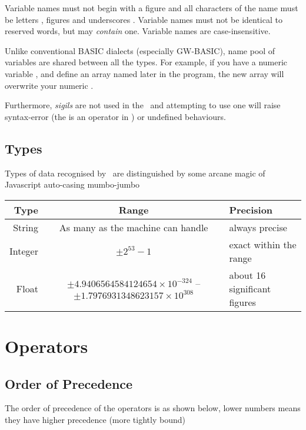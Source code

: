 Variable names must not begin with a figure and all characters of the name must be letters , figures  and underscores \code{\_}. Variable names must not be identical to reserved words, but may \emph{contain} one. Variable names are case-insensitive.

Unlike conventional BASIC dialects (especially GW-BASIC), name pool of variables are shared between all the types. For example, if you have a numeric variable , and define an array named  later in the program, the new array will overwrite your numeric .

Furthermore, \emph{sigils} are not used in the \tbas\ and attempting to use one will raise syntax-error (the \code{\$} is an operator in \tbas) or undefined behaviours.

\subsection{Types}

Types of data recognised by \tbas\ are distinguished by some arcane magic of Javascript auto-casing mumbo-jumbo

\begin{tabulary}{\textwidth}{rCL}
Type & Range & Precision \\
\hline
String & As many as the machine can handle & always precise \\
Integer & $ \pm 2^{53}-1 $ & exact within the range \\
Float & $ \pm 4.9406564584124654 \times 10^{-324} $ -- $ \pm 1.7976931348623157 \times 10^{308} $ & about 16 significant figures \\
\end{tabulary}

\section{Operators}
\subsection{Order of Precedence}

The order of precedence of the operators is as shown below, lower numbers means they have higher precedence (more tightly bound)


